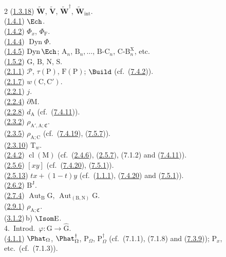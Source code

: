\documentclass[12pt,a4paper,oneside,english]{smfart}
\newcommand{\btref}[1]{\hyperlink{bt:#1}{#1}}
\theoremstyle{definition}
\theoremstyle{bt}
\begin{document}
\begin{multicols}{2}
(\btref{1.3.18}) $\widetilde{\mathbf{W}}$, $\widetilde{\mathbf{V}}$, $\widetilde{\mathbf{W}}^{\dagger}$, $\widetilde{\mathbf{W}}_{\mathrm{int}}$.\\
(\btref{1.4.1}) $\Ech$.\\
(\btref{1.4.2}) $\Phi_x$, $\Phi_{\mathrm{F}}$.\\
(\btref{1.4.4}) $\operatorname{Dyn}\Phi$.\\
(\btref{1.4.5}) $\operatorname{Dyn}\Ech$; $\mathrm{A}_n$, $\mathrm{B}_n,\dots$, $\mathrm{B}\text{-}\mathrm{C}_n$, $\mathrm{C}\text{-}\mathrm{B}_n^{\mathrm{X}}$, etc.\\
(\btref{1.5.2}) $\mathrm{G}$, $\mathrm{B}$, $\mathrm{N}$, $\mathrm{S}$.\\
(\btref{2.1.1}) $\mathscr{P}$, $\tau(\mathrm{P})$, $\mathrm{F}(\mathrm{P})$; $\Build$ (cf.\ (\btref{7.4.2})).\\
(\btref{2.1.7}) $w(\mathrm{C},\mathrm{C}')$.\\
(\btref{2.2.1}) $j$.\\
(\btref{2.2.4}) $\partial \mathrm{M}$.\\
(\btref{2.2.8}) $d_{\mathrm{A}}$ (cf.\ (\btref{7.4.11})).\\
(\btref{2.3.2}) $\rho_{\mathrm{A}',\mathrm{A};\mathfrak{C}}$.\\
(\btref{2.3.5}) $\rho_{\mathrm{A};\mathrm{C}}$ (cf.\ (\btref{7.4.19}), (\btref{7.5.7})).\\
(\btref{2.3.10}) $\mathrm{T}_w$.\\
(\btref{2.4.2}) $\operatorname{cl}(\mathrm{M})$ (cf.\ (\btref{2.4.6}), (\btref{2.5.7}), (7.1.2) and (\btref{7.4.11})).\\
(\btref{2.5.6}) $[xy]$ (cf.\ (\btref{7.4.20}), (\btref{7.5.1})).\\
(\btref{2.5.13}) $tx+(1-t)y$ (cf.\ (\btref{1.1.1}), (\btref{7.4.20}) and (\btref{7.5.1})).\\
(\btref{2.6.2}) $\mathrm{B}^{\mathrm{J}}$.\\
(\btref{2.7.4}) $\operatorname{Aut}_{\mathrm{B}}\mathrm{G}$, $\operatorname{Aut}_{(\mathrm{B},\mathrm{N})}\mathrm{G}$.\\
(\btref{2.9.1}) $\rho_{\mathrm{A};\mathfrak{C}}$.\\
(\btref{3.1.2})\,b) $\Isom \mathrm{E}$.\\
4.\ Introd.\ $\varphi:\mathrm{G}\to\widehat{\mathrm{G}}$.\\
(\btref{4.1.1}) $\Phat_{\Omega}$, $\Phat^{\dagger}_{\Omega}$, $\mathrm{P}_{\Omega}$, $\mathrm{P}^{\dagger}_{\Omega}$ (cf.\ (7.1.1), (7.1.8) and (\btref{7.3.9})); $\mathrm{P}_x$, etc.\ (cf.\ (7.1.3)).\\

\end{multicols}
\end{document}
